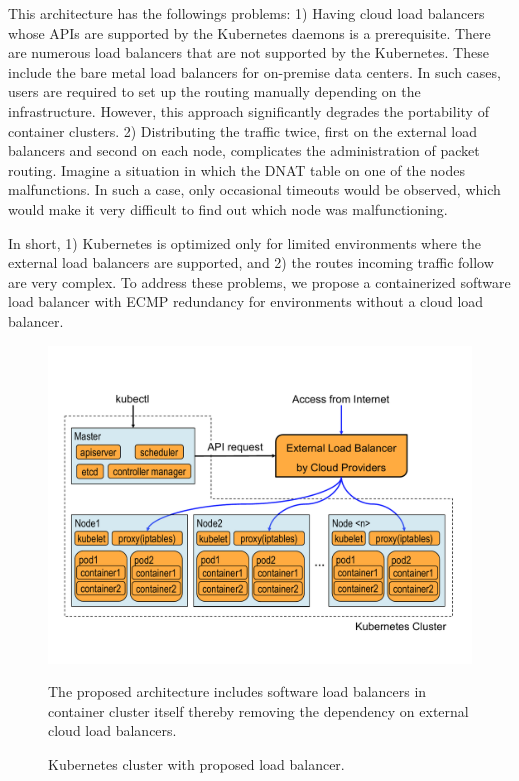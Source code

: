This architecture has the followings problems: 
1) Having cloud load balancers whose APIs are supported by the Kubernetes daemons is a prerequisite.
There are numerous load balancers that are not supported by the Kubernetes.
These include the bare metal load balancers for on-premise data centers.
In such cases, users are required to set up the routing manually depending on the infrastructure.
However, this approach significantly degrades the portability of container clusters.
2) Distributing the traffic twice, first on the external load balancers and second on each node, 
complicates the administration of packet routing. 
Imagine a situation in which the DNAT table on one of the nodes malfunctions.
In such a case, only occasional timeouts would be observed, which would make it very difficult to find out which node was malfunctioning.   

In short, 1) Kubernetes is optimized only for limited environments where the external load balancers are supported, 
and 2) the routes incoming traffic follow are very complex.
%
To address these problems, we propose a containerized software load balancer with ECMP redundancy for environments without a cloud load balancer.

\begin{figure}[tb]
\includegraphics[width=1.0\columnwidth]{Figs/K8sProposed}
\caption{Kubernetes cluster with proposed load balancer.}
The proposed architecture includes software load balancers in container cluster itself thereby removing the dependency on external cloud load balancers.
\label{fig:K8sProposed}
\end{figure}

